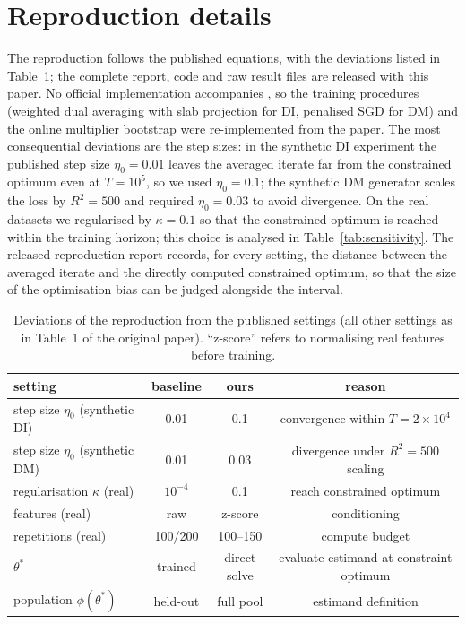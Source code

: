 \documentclass[11pt]{article}
\begin{document}
\section{Reproduction details}
\label{app:repro}

The reproduction follows the published equations, with the deviations listed in
Table~\ref{tab:deviations}; the complete report, code and raw result files are released with this
paper.  No official implementation accompanies \citet{roy2026uq}, so the training procedures
(weighted dual averaging with slab projection for DI, penalised SGD for DM) and the online multiplier
bootstrap were re-implemented from the paper.  The most consequential deviations are the step sizes:
in the synthetic DI experiment the published step size $\eta_0=0.01$ leaves the averaged iterate far
from the constrained optimum even at $T=10^5$, so we used $\eta_0=0.1$; the synthetic DM generator
scales the loss by $R^2=500$ and required $\eta_0=0.03$ to avoid divergence.  On the real datasets we
regularised by $\kappa=0.1$ so that the constrained optimum is reached within the training horizon;
this choice is analysed in Table~\ref{tab:sensitivity}.  The released reproduction report records, for
every setting, the distance between the averaged iterate and the directly computed constrained
optimum, so that the size of the optimisation bias can be judged alongside the interval.

\begin{table}[t]
\centering
\footnotesize
\setlength{\tabcolsep}{4pt}
\caption{Deviations of the reproduction from the published settings (all other settings as in Table~1 of the original paper).  ``z-score'' refers to normalising real features before training.}
\label{tab:deviations}
\begin{tabular}{lccc}
\toprule
setting & baseline & ours & reason \\
\midrule
step size $\eta_0$ (synthetic DI) & 0.01 & 0.1 & convergence within $T=2\times10^4$ \\
step size $\eta_0$ (synthetic DM) & 0.01 & 0.03 & divergence under $R^2=500$ scaling \\
regularisation $\kappa$ (real) & $10^{-4}$ & 0.1 & reach constrained optimum \\
features (real) & raw & z-score & conditioning \\
repetitions (real) & 100/200 & 100--150 & compute budget \\
$\theta^*$ & trained & direct solve & evaluate estimand at constraint optimum \\
population $\phi(\theta^*)$ & held-out & full pool & estimand definition \\
\bottomrule
\end{tabular}
\end{table}


\end{document}
